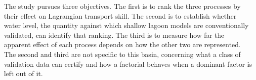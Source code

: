 The study pursues three objectives. The first is to rank the three processes by
their effect on Lagrangian transport skill. The second is to establish whether
water level, the quantity against which shallow lagoon models are
conventionally validated, can identify that ranking. The third is to measure
how far the apparent effect of each process depends on how the other two are
represented. The second and third are not specific to this basin, concerning
what a class of validation data can certify and how a factorial behaves when a
dominant factor is left out of it.
